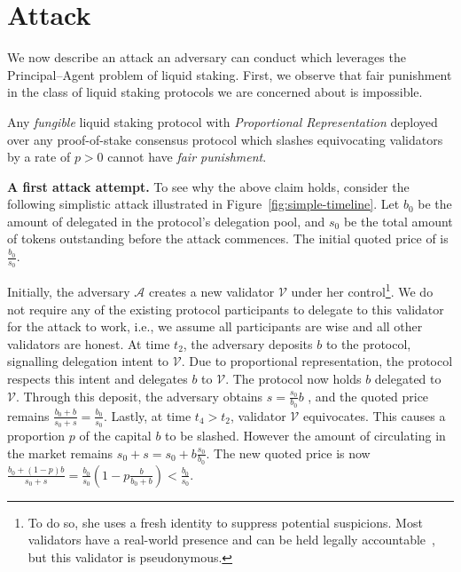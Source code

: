 \section{Attack}\label{sec:attack}

We now describe an attack an adversary can conduct which leverages the
Principal--Agent problem of liquid staking. First, we observe that
fair punishment in the class of liquid staking protocols we are concerned
about is impossible.

\begin{claim}
Any \emph{fungible} liquid staking protocol with \emph{Proportional Representation}
deployed over any proof-of-stake consensus protocol which slashes equivocating validators by a rate of $p > 0$
cannot have \emph{fair punishment}.
\end{claim}

\noindent
\textbf{A first attack attempt.}
To see why the above claim holds, consider the following simplistic attack
illustrated in Figure~\ref{fig:simple-timeline}.
Let $b_0$ be the amount of delegated \asset in the protocol's delegation pool,
and $s_0$ be the total amount of \stasset tokens outstanding
before the attack commences. The initial quoted price of \stasset
is $\frac{b_0}{s_0}$.

Initially, the adversary $\mathcal{A}$ creates
a new validator $\mathcal{V}$ under her
control\footnote{To do so, she uses a fresh identity
to suppress potential suspicions. Most validators
have a real-world presence and can be held legally
accountable~\cite[p.~29]{liquid-staking-report}, but this validator is pseudonymous.}.
We do not require any of the existing protocol participants to delegate
to this validator for the attack to work, i.e., we assume all participants
are wise and all other validators are honest.
At time $t_2$, the adversary deposits $b$ \asset to the protocol,
signalling delegation intent to $\mathcal{V}$.
Due to proportional representation,
the protocol respects this intent and delegates $b$ \asset to $\mathcal{V}$.
The protocol now holds $b$ delegated \asset to $\mathcal{V}$.
Through this deposit, the adversary obtains
$s = \frac{s_0}{b_0} b$ \stasset, and the quoted price remains
$\frac{b_0 + b}{s_0 + s} = \frac{b_0}{s_0}$.
Lastly, at time $t_4 > t_2$, validator
$\mathcal{V}$ equivocates. This causes a proportion $p$ of
the capital $b$ to be slashed.
However the amount of \stasset circulating in the
market remains $s_0 + s = s_0 + b\frac{s_0}{b_0}$.
The new quoted price is now
$\frac{b_0 + (1 - p)b}{s_0 + s} = \frac{b_0}{s_0}(1 - p\frac{b}{b_0 + b}) < \frac{b_0}{s_0}$.

